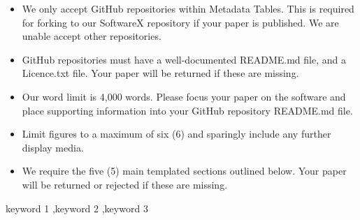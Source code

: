 \documentclass[preprint,12pt, a4paper]{elsarticle}
\begin{document}
\begin{frontmatter}
\begin{itemize}
              \begin{itemize}
                  \item We only accept GitHub repositories within Metadata Tables. This is required for forking to our SoftwareX repository if your paper is published. We are unable accept other repositories.
                  \item GitHub repositories must have a well-documented README.md file, and a Licence.txt file. Your paper will be returned if these are missing.
                  \item Our word limit is 4,000 words. Please focus your paper on the software and place supporting information into your GitHub repository README.md file.
                  \item Limit figures to a maximum of six (6) and sparingly include any further display media.
                  \item We require the five (5) main templated sections outlined below. Your paper will be returned or rejected if these are missing.
              \end{itemize}
    \end{itemize}

    \begin{abstract}
        Ca. 100 words
        diff = depoendency injection framework First variant

    \end{abstract}

    \begin{keyword}
        keyword 1 \sep keyword 2 \sep keyword 3



    \end{keyword}

\end{frontmatter}
\end{document}
